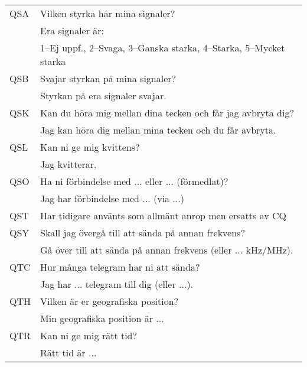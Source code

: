 \documentclass[10pt,swedish,a4paper]{article}
\begin{document}
\begin{longtable}{ll}
	QSA          & Vilken styrka har mina signaler?                                      \\
	             & Era signaler är:                                                      \\
	             & 1--Ej uppf., 2--Svaga, 3--Ganska starka, 4--Starka, 5--Mycket starka  \\ \hline
	QSB          & Svajar styrkan på mina signaler?                                      \\
	             & Styrkan på era signaler svajar.                                       \\ \hline
	QSK          & Kan du höra mig mellan dina tecken och får jag avbryta dig? \\
	             & Jag kan höra dig mellan mina tecken och du får avbryta.               \\ \hline
	QSL          & Kan ni ge mig kvittens?                                               \\
	             & Jag kvitterar.                                                        \\ \hline
	QSO          & Ha ni förbindelse med ... eller ... (förmedlat)?                      \\
	             & Jag har förbindelse med ... (via ...)                                 \\ \hline
	QST          & Har tidigare använts som allmänt anrop men ersatts av CQ              \\ \hline
	QSY          & Skall jag övergå till att sända på annan frekvens?                    \\
	             & Gå över till att sända på annan frekvens (eller ... kHz/MHz).         \\ \hline
	QTC          & Hur många telegram har ni att sända?                                  \\
	             & Jag har ... telegram till dig (eller ...).                            \\ \hline
	QTH          & Vilken är er geografiska position?                                    \\
	             & Min geografiska position är ...                                       \\ \hline
	QTR          & Kan ni ge mig rätt tid?                                               \\
	             & Rätt tid är ...                                                       \\ \hline
\end{longtable}
\end{document}
